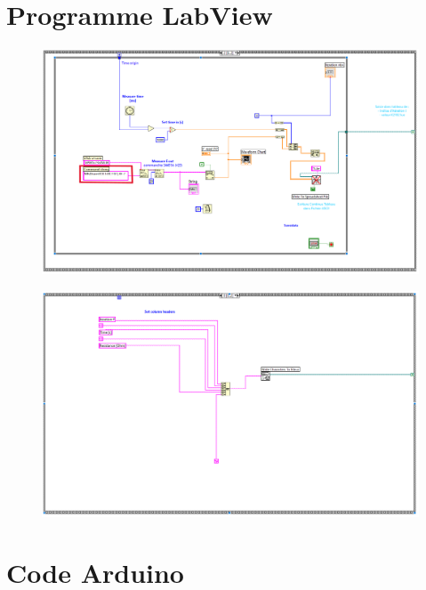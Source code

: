 \documentclass[
    iai & comatec, %
    mi, %
]{heig-tb}
\begin{document}
\section{Programme LabView}
\begin{figure}[H]
    \hspace{-1cm}
    \includegraphics[scale = 0.5]{assets/figures/LabView1.PNG}
\end{figure}
\begin{figure}[H]
    \hspace{-1cm}
    \includegraphics[scale = 0.5]{assets/figures/LabView2.PNG}
\end{figure}

\section{Code Arduino}


\newpage
\end{document}
